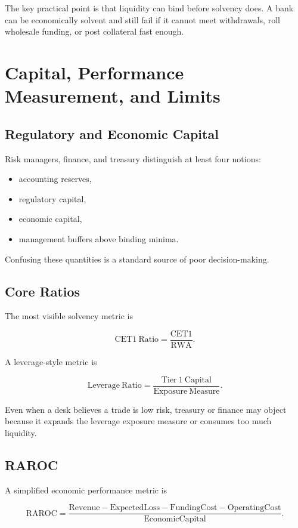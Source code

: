 \documentclass{apex_mdd}
\begin{document}
The key practical point is that liquidity can bind before solvency does. A bank can be economically solvent and still fail if it cannot meet withdrawals, roll wholesale funding, or post collateral fast enough.

\section{Capital, Performance Measurement, and Limits}

\subsection{Regulatory and Economic Capital}

Risk managers, finance, and treasury distinguish at least four notions:
\begin{itemize}
  \item accounting reserves,
  \item regulatory capital,
  \item economic capital,
  \item management buffers above binding minima.
\end{itemize}

Confusing these quantities is a standard source of poor decision-making.

\subsection{Core Ratios}

The most visible solvency metric is
\begin{formulabox}
\[
  \mathrm{CET1\ Ratio} = \frac{\mathrm{CET1}}{\mathrm{RWA}}.
\]
\end{formulabox}

A leverage-style metric is
\begin{formulabox}
\[
  \mathrm{Leverage\ Ratio} = \frac{\mathrm{Tier\ 1\ Capital}}{\mathrm{Exposure\ Measure}}.
\]
\end{formulabox}

Even when a desk believes a trade is low risk, treasury or finance may object because it expands the leverage exposure measure or consumes too much liquidity.

\subsection{RAROC}

A simplified economic performance metric is
\begin{formulabox}
\[
  \mathrm{RAROC}
  =
  \frac{\mathrm{Revenue}
  - \mathrm{ExpectedLoss}
  - \mathrm{FundingCost}
  - \mathrm{OperatingCost}}
  {\mathrm{EconomicCapital}}.
\]
\end{formulabox}
\end{document}
